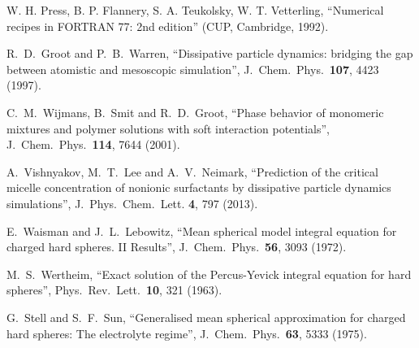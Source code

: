 \documentclass[12pt,a4paper]{article}
\begin{document}
 W. H. Press, B. P. Flannery, S. A. Teukolsky,
  W. T. Vetterling, ``Numerical recipes in FORTRAN 77: 2nd edition''
  (CUP, Cambridge, 1992).

 R.~D.~Groot and P.~B.~Warren, ``Dissipative particle
  dynamics: bridging the gap between atomistic and mesoscopic
  simulation'', J.\ Chem.\ Phys.\ {\bf107}, 4423 (1997).

 C.~M.~Wijmans, B.~Smit and R.~D.~Groot, ``Phase
  behavior of monomeric mixtures and polymer solutions with soft
  interaction potentials'', J.\ Chem.\ Phys.\ {\bf114}, 7644 (2001).

 A.~Vishnyakov, M.~T.~Lee and A.~V.~Neimark,
  ``Prediction of the critical micelle concentration of nonionic
  surfactants by dissipative particle dynamics simulations'',
  J.\ Phys.\ Chem.\ Lett. {\bf4}, 797 (2013).

 E.~Waisman and J.~L.~Lebowitz, ``Mean spherical model
  integral equation for charged hard spheres. II Results'',
  J.\ Chem.\ Phys.\ {\bf56}, 3093 (1972).

 M.~S.~Wertheim, ``Exact solution of the Percus-Yevick
  integral equation for hard spheres'', Phys.\ Rev.\ Lett.\ {\bf10},
  321 (1963).

 G.~Stell and S.~F.~Sun, ``Generalised mean spherical
  approximation for charged hard spheres: The electrolyte regime'',
  J.\ Chem.\ Phys.\ {\bf63}, 5333 (1975).
\end{document}
